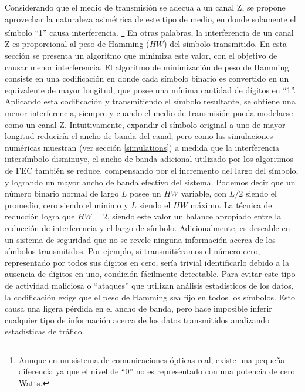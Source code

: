 
Considerando que el medio de transmisión se adecua a un canal Z, se propone aprovechar la naturaleza asimétrica de este tipo de medio, en donde solamente el símbolo ``1'' causa interferencia. \footnote{Aunque en un sistema de comunicaciones ópticas real, existe una pequeña diferencia ya que el nivel de ``0'' no es representado con una potencia de cero Watts.}
En otras palabras, la interferencia de un canal Z es proporcional al peso de Hamming ($HW$) del símbolo transmitido.
En esta sección se presenta un algoritmo que minimiza este valor, con el objetivo de causar menor interferencia. El algoritmo de minimización de peso de Hamming consiste en una codificación en donde cada símbolo binario es convertido en un equivalente de mayor longitud, que posee una mínima cantidad de dígitos en ``1''. Aplicando esta codificación y transmitiendo el símbolo resultante, se obtiene una menor interferencia, siempre y cuando el medio de transmisión pueda modelarse como un canal Z.
Intuitivamente, expandir el símbolo original a uno de mayor longitud reduciría el ancho de banda del canal; pero como las simulaciones numéricas muestran (ver sección \ref{simulations}) a medida que la interferencia intersímbolo disminuye, el ancho de banda adicional utilizado por los algoritmos de FEC también se reduce, compensando por el incremento del largo del símbolo, y logrando un mayor ancho de banda efectivo del sistema.
Podemos decir que un número binario normal de largo $L$ posee un $HW$ variable, con $L/2$ siendo el promedio, cero siendo el mínimo y $L$ siendo el $HW$ máximo.
La técnica de reducción logra que $HW=2$, siendo este valor un balance apropiado entre la reducción de interferencia y el largo de símbolo.
Adicionalmente, es deseable en un sistema de seguridad que no se revele ninguna información acerca de los símbolos transmitidos. Por ejemplo, si transmitiéramos el número cero, representado por todos sus dígitos en cero, sería trivial identificarlo debido a la ausencia de dígitos en uno, condición fácilmente detectable. Para evitar este tipo de actividad maliciosa o ``ataques'' que utilizan análisis estadísticos de los datos, la codificación exige que el peso de Hamming sea fijo en todos los símbolos. Esto causa una ligera pérdida en el ancho de banda, pero hace imposible inferir cualquier tipo de información acerca de los datos transmitidos analizando estadísticas de tráfico.

